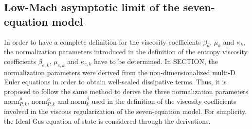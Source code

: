 \documentclass[preprint,10pt]{elsarticle}
\newcommand{\norm}{\textrm{norm}}
\begin{document}
\subsection{Low-Mach asymptotic limit of the seven-equation model}\label{sec:low-Mach-sem}
%
In order to have a complete definition for the viscosity coefficients $\beta_k$, $\mu_k$ and $\kappa_k$, the normalization parameters introduced in the definition of the entropy viscosity coefficients $\beta_{e,k}$, $\mu_{e,k}$ and $\kappa_{e,k}$ have to be determined. In SECTION, the normalization parameters were derived from the non-dimensionalized multi-D Euler equations in order to obtain well-scaled dissipative terms. Thus, it is proposed to follow the same method to derive the three normalization parameters $\norm_{P,k}^\mu$, $\norm_{P,k}^\kappa$ and $\norm_{k}^\beta$ used in the definition of the viscosity coefficients involved in the viscous regularization of the seven-equation model. For simplicity, the Ideal Gas equation of state is considered through the derivations.
\end{document}
